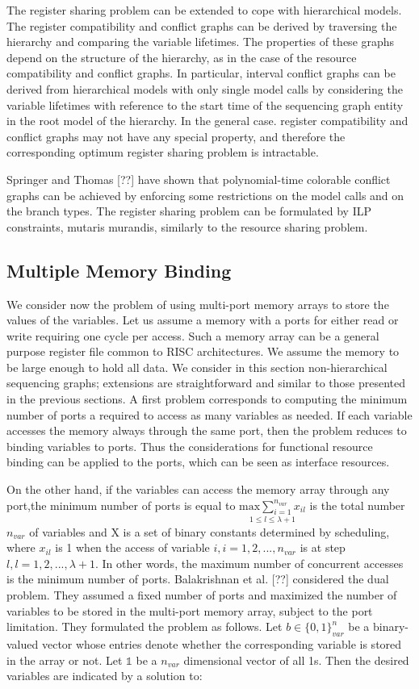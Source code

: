 The register sharing problem can be extended to cope with hierarchical models. The register compatibility and conflict graphs can be derived by traversing the hierarchy and comparing the variable lifetimes. The properties of these graphs depend on the structure of the hierarchy, as in the case of the resource compatibility and conflict graphs. In particular, interval conflict graphs can be derived from hierarchical models with only single model calls by considering the variable lifetimes with reference to the start time of the sequencing graph entity in the root model of the hierarchy. In the general case. register compatibility and conflict graphs may not have any special property, and therefore the corresponding optimum register sharing problem is intractable. 

Springer and Thomas [??] have shown that polynomial-time colorable conflict graphs can be achieved by enforcing some restrictions on the model calls and on the branch types. The register sharing problem can be formulated by ILP constraints, mutaris murandis, similarly to the resource sharing problem. 

\subsection{Multiple Memory Binding}
We consider now the problem of using multi-port memory arrays to store the values of the variables. Let us assume a memory with a ports for either read or write requiring one cycle per access. Such a memory array can be a general purpose register file common to RISC architectures. We assume the memory to be large enough to hold all data. We consider in this section non-hierarchical sequencing graphs; extensions are straightforward and similar to those presented in the previous sections. 
A first problem corresponds to computing the minimum number of ports a required to access as many variables as needed. If each variable accesses the memory always through the same port, then the problem reduces to binding variables to ports. Thus the considerations for functional resource binding can be applied to the ports, which can be seen as interface resources. 

On the other hand, if the variables can access the memory array through any port,the minimum number of ports is equal to $\underset{1\leq l \leq \lambda + 1}{\mathrm{max} \sum_{i=1}^{n_{var}} x_{il}} $ is the total number $ {n_{var}} $ of variables and X is a set of binary constants determined by scheduling, where $ x_{il} $ is 1 when the access of variable $ i,i=1,2,...,n_{var} $ is at step $ l,l=1,2,..., \lambda+1 $. In other words, the maximum number of concurrent accesses is the minimum number of ports. 
Balakrishnan et al. [??] considered the dual problem. They assumed a fixed number of ports and maximized the number of variables to be stored in the multi-port memory array, subject to the port limitation. They formulated the problem as follows. 
Let $ b \in \{0,1\}^n_{var} $  be a binary-valued vector whose entries denote whether the corresponding variable is stored in the array or not. Let $ \mathds{1} $ be a $ n_{var}  $ dimensional vector of all 1s. Then the desired variables are indicated by a solution to:

